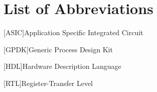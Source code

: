 \section*{List of Abbreviations}
\begin{acronym}
	[ASIC]{Application Specific Integrated Circuit}
		
	[GPDK]{Generic Process Design Kit}
		
	[HDL]{Hardware Description Language}
		
	[RTL]{Register-Transfer Level}
\end{acronym}


